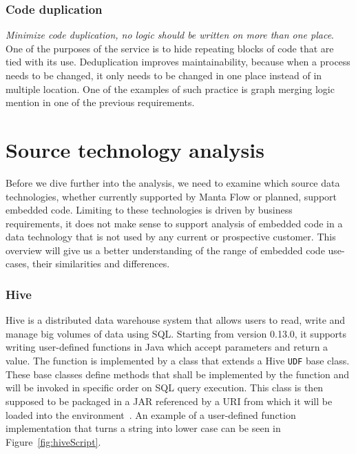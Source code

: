 \subsubsection{Code duplication}

\textit{Minimize code duplication, no logic should be written on more than one place}. One of the purposes of the service is to hide repeating blocks of code that are tied with its use. Deduplication improves maintainability, because when a process needs to be changed, it only needs to be changed in one place instead of in multiple location. One of the examples of such practice is graph merging logic mention in one of the previous requirements.

\section{Source technology analysis}

Before we dive further into the analysis, we need to examine which source data technologies, whether currently supported by Manta Flow or planned, support embedded code. Limiting to these technologies is driven by business requirements, it does not make sense to support analysis of embedded code in a data technology that is not used by any current or prospective customer. This overview will give us a better understanding of the range of embedded code use-cases, their similarities and differences.

\subsubsection{Hive}
Hive is a distributed data warehouse system that allows users to read, write and manage big volumes of data using SQL. Starting from version 0.13.0, it supports writing user-defined functions in Java which accept parameters and return a value. The function is implemented by a class that extends a Hive \texttt{UDF} base class. These base classes define methods that shall be implemented by the function and will be invoked in specific order on SQL query execution. This class is then supposed to be packaged in a JAR referenced by a URI from which it will be loaded into the environment~\cite{hive}. An example of a user-defined function implementation that turns a string into lower case can be seen in Figure~\ref{fig:hiveScript}.

